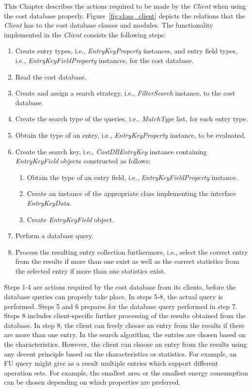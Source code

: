 \documentclass[a4paper,twoside]{tce}
\begin{document}
This Chapter describes the actions required to be made by the
\emph{Client} when using the cost database properly.
Figure~\ref{fig:class_client} depicts the relations that the
\emph{Client} has to the cost database classes and modules. The
functionality implemented in the \emph{Client} consists the following
steps:
\begin{enumerate}
\item Create entry types, i.e., \emph{EntryKeyProperty} instances,
      and entry field types, i.e., \emph{EntryKeyFieldProperty}
      instances, for the cost database.
\item Read the cost database.
\item Create and assign a search strategy, i.e., \emph{FilterSearch}
      instance, to the cost database.
\item Create the search type of the queries, i.e., \emph{MatchType}
      list, for each entry type.

\item Obtain the type of an entry, i.e., \emph{EntryKeyProperty}
      instance, to be evaluated.
\item Create the search key, i.e., \emph{CostDBEntryKey} instance
      containing \emph{EntryKeyField} objects constructed as follows:
      \begin{enumerate}
      \item Obtain the type of an entry field, i.e., 
            \emph{EntryKeyFieldProperty} instance.
      \item Create an instance of the appropriate class implementing
            the interface \emph{EntryKeyData}.
      \item Create \emph{EntryKeyField} object.
      \end{enumerate}
\item Perform a database query.
\item Process the resulting entry collection furthermore, i.e., select
      the correct entry from the results if more than one exist as
      well as the correct statistics from the selected entry if more
      than one statistics exist.

\end{enumerate}
Steps 1-4 are actions required by the cost database from its clients,
before the database queries can properly take place. In steps 5-8,
the actual query is performed. Steps 5 and 6 prepares for the database
query performed in step 7. Steps 8 includes client-specific further
processing of the results obtained from the database. In step 8, the
client can freely choose an entry from the results if there are more
than one entry. In the search algorithm, the entries are chosen based
on the characteristics. However, the client can choose an entry from
the results using any decent principle based on the characteristics or
statistics. For example, an FU query might give as a result multiple
entries which support different operation sets. For example, the
smallest area or the smallest energy consumption can be chosen
depending on which properties are preferred.
\end{document}
